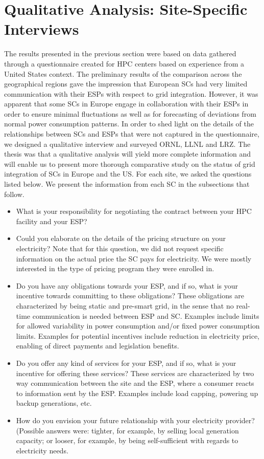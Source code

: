 \section{Qualitative Analysis: Site-Specific Interviews}
\label{intws}

The results presented in the previous section were based on data gathered through a questionnaire created for HPC centers based on experience from a United States context. The preliminary results of the comparison across the geographical regions gave the impression that European SCs had very limited communication with their ESPs with respect to grid integration. 
However, it was apparent that some SCs in Europe engage in collaboration with their ESPs in order to ensure minimal fluctuations as well as for forecasting of deviations from normal power consumption patterns. 
In order to shed light on the details of the relationships between SCs and ESPs that were not captured in the questionnaire, we designed a qualitative interview and surveyed ORNL, LLNL and LRZ. The thesis was that a qualitative analysis will yield more complete information and will enable us to present more thorough comparative study on the status of grid integration of SCs in Europe and the US. For each site, we asked the questions listed below. We present the information from each SC in the subsections that follow.

\begin{itemize}
\item {What is your responsibility for negotiating the contract between your HPC facility and your ESP? }
\item {Could you elaborate on the details of the pricing structure on your electricity? Note that for this question, we did not request specific information on the actual price the SC pays for electricity. We were mostly interested in the type of pricing program they were enrolled in.} 
\item {Do you have any obligations towards your ESP, and if so, what is your incentive towards committing to these obligations? These obligations are characterized by being static and pre-smart grid, in the sense that no real-time communication is needed between ESP and SC. Examples include limits for allowed variability in power consumption and/or fixed power consumption limits. Examples for potential incentives include reduction in electricity price, enabling of direct payments and legislation benefits. }
\item{Do you offer any kind of services for your ESP, and if so, what is your incentive for offering these services? These services are characterized by two way communication between the site and the ESP, where a consumer reacts to information sent by the ESP. Examples include load capping, powering up backup generations, etc.}
\item{How do you envision your future relationship with your electricity provider? (Possible answers were: tighter, for example, by selling local generation capacity; or looser, for example, by being self-sufficient with regards to electricity needs.}
\end{itemize}

